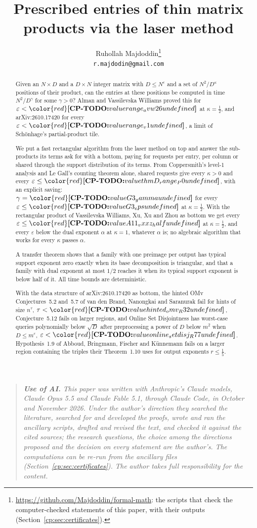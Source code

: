 \documentclass[11pt]{article}
\title{Prescribed entries of thin matrix products via the laser method}
\author{Ruhollah Majdoddin\thanks{\url{https://github.com/Majdoddin/formal-math}: the scripts that check the computer-checked statements of this paper, with their outputs (Section~\ref{cp:sec:certificates}).}\\ \normalsize\texttt{r.majdodin@gmail.com}}%
\date{}
\makeatletter
\theoremstyle{definition}
\theoremstyle{remark}
\DeclareRobustCommand{\CPTODO}[1]{{\color{red}\textbf{[CP-TODO:} #1\textbf{]}}}
\providecommand{\eps}{\varepsilon}
\newcommand{\cpv}[1]{\ifcsname cpv@#1\endcsname\csname cpv@#1\endcsname\else\CPTODO{value #1 undefined}\fi}
\makeatother
\begin{document}
\maketitle

\begin{abstract}
Given an $N\times D$ and a $D\times N$ integer matrix with $D\le N^\eps$ and a set of $N^2/D^\kappa$ positions of their product, can the entries at these positions be computed in time $N^2/D^\gamma$ for some $\gamma>0$? Alman and Vassilevska Williams proved this for $\eps<\cpv{range_avw26}$ at $\kappa=\frac12$, and arXiv:2610.17420 for every $\eps<\cpv{range_v1}$, a limit of Schönhage's partial-product tile.

We put a fast rectangular algorithm from the laser method on top and answer the sub-products its terms ask for with a bottom, paying for requests per entry, per column or shared through the support distribution of its terms. From Coppersmith's level-1 analysis and Le Gall's counting theorem alone, shared requests give every $\kappa>0$ and every $\eps\le\cpv{thmD_range_P0}$, with an explicit saving: $\gamma=\cpv{G3_gamma}$ for every $\eps\le\cpv{G3_eps}$ at $\kappa=\frac12$. With the rectangular product of Vassilevska Williams, Xu, Xu and Zhou as bottom we get every $\eps\le\cpv{A11_vxxz_half}$ at $\kappa=\frac12$, and every $\eps$ below the dual exponent $\alpha$ at $\kappa=1$, whatever $\alpha$ is; no algebraic algorithm that works for every $\kappa$ passes $\alpha$.

A transfer theorem shows that a family with one preimage per output has typical support exponent zero exactly when its base decomposition is triangular, and that a family with dual exponent at most $1/2$ reaches it when its typical support exponent is below half of it. All time bounds are deterministic.

With the data structure of arXiv:2610.17420 as bottom, the hinted OMv Conjectures~5.2 and~5.7 of van den Brand, Nanongkai and Saranurak fail for hints of size $n^\tau$, $\tau<\cpv{hinted_omv_R32}$, Conjecture~5.12 fails on larger regions, and Online Set Disjointness has worst-case queries polynomially below $\sqrt D$ after preprocessing a power of $D$ below $m^2$ when $D\le m^\eps$, $\eps<\cpv{online_setdisj_R77}$. Hypothesis~1.9 of Abboud, Bringmann, Fischer and Künnemann fails on a larger region containing the triples their Theorem~1.10 uses for output exponents $r\le\frac15$.
\end{abstract}

\begin{quote}\small\itshape
\textbf{Use of AI.} This paper was written with Anthropic's Claude models, Claude Opus 5.5 and Claude Fable 5.1, through Claude Code, in October and November 2026. Under the author's direction they searched the literature, searched for and developed the proofs, wrote and ran the ancillary scripts, drafted and revised the text, and checked it against the cited sources; the research questions, the choice among the directions proposed and the decision on every statement are the author's. The computations can be re-run from the ancillary files (Section~\ref{cp:sec:certificates}). The author takes full responsibility for the content.
\end{quote}
\end{document}
